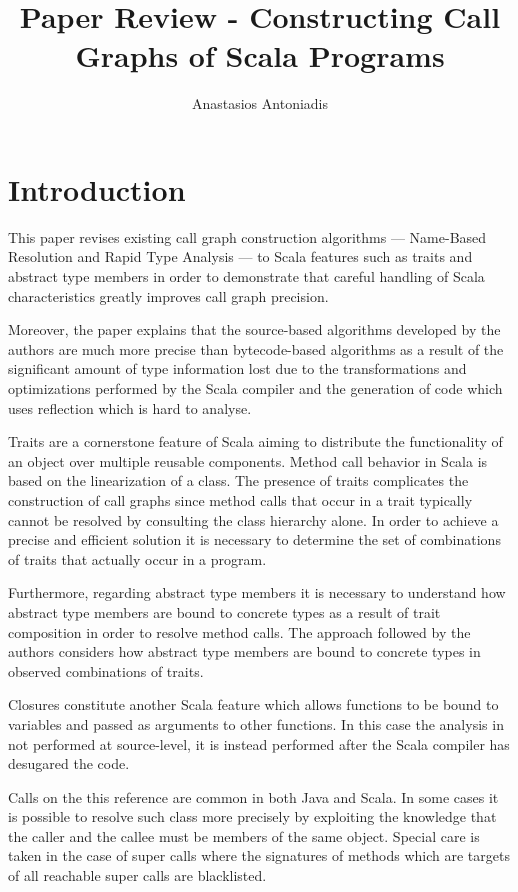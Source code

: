 \documentclass{article} \usepackage{hyperref} \usepackage{graphicx}
\begin{document}
\title{Paper Review - Constructing Call Graphs of Scala Programs}
\author{Anastasios Antoniadis}

\maketitle

\section{Introduction}

This paper revises existing call graph construction algorithms ---
Name-Based Resolution and Rapid Type Analysis --- to Scala features
such as traits and abstract type members in order to demonstrate that
careful handling of Scala characteristics greatly improves call graph
precision.

Moreover, the paper explains that the source-based algorithms
developed by the authors are much more precise than bytecode-based
algorithms as a result of the significant amount of type information
lost due to the transformations and optimizations performed by the
Scala compiler and the generation of code which uses reflection which
is hard to analyse.

Traits are a cornerstone feature of Scala aiming to distribute the
functionality of an object over multiple reusable components. Method
call behavior in Scala is based on the linearization of a class. The
presence of traits complicates the construction of call graphs since
method calls that occur in a trait typically cannot be resolved by
consulting the class hierarchy alone. In order to achieve a precise
and efficient solution it is necessary to determine the set of
combinations of traits that actually occur in a program.

Furthermore, regarding abstract type members it is necessary to
understand how abstract type members are bound to concrete types as a
result of trait composition in order to resolve method calls. The
approach followed by the authors considers how abstract type members
are bound to concrete types in observed combinations of traits.

Closures constitute another Scala feature which allows functions to be
bound to variables and passed as arguments to other functions. In this
case the analysis in not performed at source-level, it is instead
performed after the Scala compiler has desugared the code.

Calls on the this reference are common in both Java and Scala. In some
cases it is possible to resolve such class more precisely by
exploiting the knowledge that the caller and the callee must be
members of the same object. Special care is taken in the case of super
calls where the signatures of methods which are targets of all
reachable super calls are blacklisted.
\end{document}
